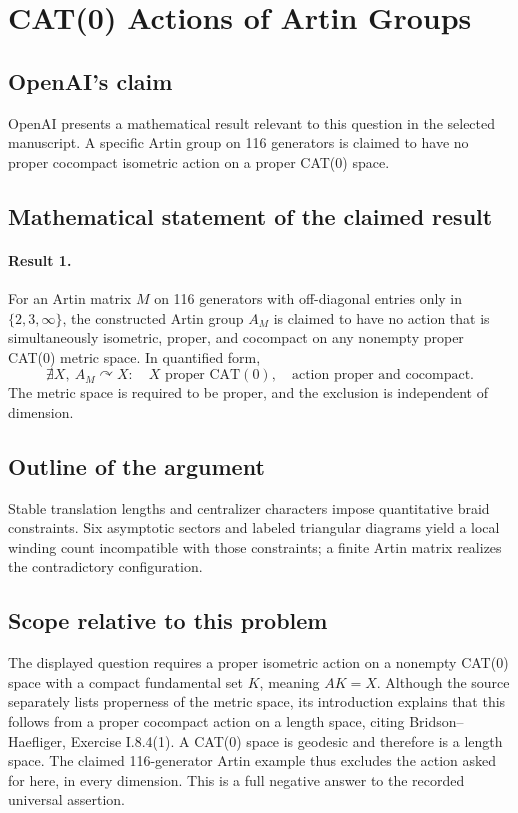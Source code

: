 \documentclass[11pt]{article}
\begin{document}
\section*{CAT(0) Actions of Artin Groups}

\subsection{OpenAI's claim}
OpenAI presents a mathematical result relevant to this question in the selected manuscript. A specific Artin group on 116 generators is claimed to have no proper cocompact isometric action on a proper CAT(0) space.

\subsection{Mathematical statement of the claimed result}
\paragraph{Result 1.} For an Artin matrix \(M\) on 116 generators with off-diagonal entries only in \(\{2,3,\infty\}\), the constructed Artin group \(A_M\) is claimed to have no action that is simultaneously isometric, proper, and cocompact on any nonempty proper CAT(0) metric space. In quantified form,
\[
 \nexists X,\ A_M\curvearrowright X:\quad
 X\text{ proper CAT}(0),\quad\text{action proper and cocompact}.
\]
The metric space is required to be proper, and the exclusion is independent of dimension.

\subsection{Outline of the argument}
Stable translation lengths and centralizer characters impose quantitative braid constraints. Six asymptotic sectors and labeled triangular diagrams yield a local winding count incompatible with those constraints; a finite Artin matrix realizes the contradictory configuration.

\subsection{Scope relative to this problem}
The displayed question requires a proper isometric action on a nonempty CAT(0) space with a compact fundamental set $K$, meaning $AK=X$. Although the source separately lists properness of the metric space, its introduction explains that this follows from a proper cocompact action on a length space, citing Bridson--Haefliger, Exercise I.8.4(1). A CAT(0) space is geodesic and therefore is a length space. The claimed 116-generator Artin example thus excludes the action asked for here, in every dimension. This is a full negative answer to the recorded universal assertion.
\end{document}
